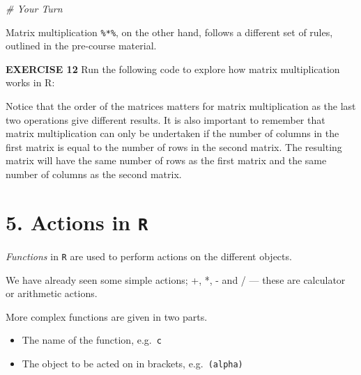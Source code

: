 \documentclass[
]{article}
\newenvironment{Shaded}{\begin{snugshade}}{\end{snugshade}}
\newcommand{\CommentTok}[1]{\textcolor[rgb]{0.56,0.35,0.01}{\textit{#1}}}
\newcommand{\NormalTok}[1]{#1}
\newcommand{\OperatorTok}[1]{\textcolor[rgb]{0.81,0.36,0.00}{\textbf{#1}}}
\newcommand{\StringTok}[1]{\textcolor[rgb]{0.31,0.60,0.02}{#1}}
\begin{document}
\begin{Shaded}
\begin{Highlighting}[]
\CommentTok{# Your Turn}
\end{Highlighting}
\end{Shaded}

Matrix multiplication \texttt{\%*\%}, on the other hand, follows a
different set of rules, outlined in the pre-course material.

\textbf{EXERCISE 12} Run the following code to explore how matrix
multiplication works in R:

\begin{Shaded}
\end{Shaded}

Notice that the order of the matrices matters for matrix multiplication
as the last two operations give different results. It is also important
to remember that matrix multiplication can only be undertaken if the
number of columns in the first matrix is equal to the number of rows in
the second matrix. The resulting matrix will have the same number of
rows as the first matrix and the same number of columns as the second
matrix.

\hypertarget{actions-in-r}{%
\section{\texorpdfstring{5. Actions in
\texttt{R}}{5. Actions in R}}\label{actions-in-r}}

\emph{Functions} in \texttt{R} are used to perform actions on the
different objects.

We have already seen some simple actions; +, *, - and / --- these are
calculator or arithmetic actions.

More complex functions are given in two parts.

\begin{itemize}
\item
  The name of the function, e.g.~\texttt{c}
\item
  The object to be acted on in brackets, e.g.~\texttt{(alpha)}
\end{itemize}
\end{document}
